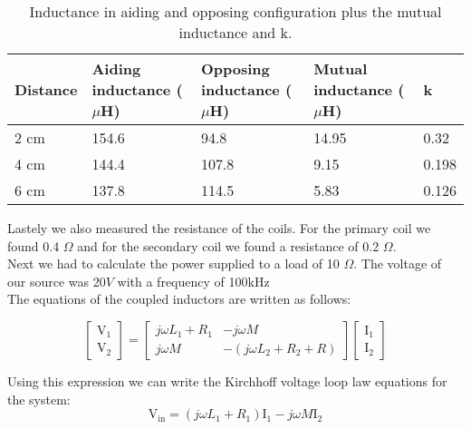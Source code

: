 \documentclass[final]{scrreprt} %
\begin{document}
\begin{table} [h]
\begin{center}
	\begin{tabular}{ l | l | l | l | l }
	Distance & Aiding inductance ($\mu$H) & Opposing inductance ($\mu$H) & Mutual inductance ($\mu$H) & k \\ \hline
  	2 cm & 154.6 & 94.8 & 14.95 & 0.32 \\
	4 cm & 144.4 & 107.8 & 9.15 & 0.198 \\
	6 cm & 137.8 & 114.5 & 5.83 & 0.126 \\
	\end{tabular}
	\caption{Inductance in aiding and opposing configuration plus the mutual inductance and k.}
	\label{tab:mutualinductance}
\end{center}
\end{table}

Lastely we also measured the resistance of the coils. For the primary coil we found 0.4 $\Omega$ and for the secondary coil we found a resistance of 0.2 $\Omega$. \\

Next we had to calculate the power supplied to a load of 10 $\Omega$. The voltage of our source was 20$V$ with a frequency of 100$\mathrm{kHz}$\\
The equations of the coupled inductors are written as follows: 

\[\left[ {\begin{array}{*{20}{c}}
{{{\boldsymbol{\mathrm{V_1}}}}}\\
{{\boldsymbol{\mathrm{V_2}}}}
\end{array}} \right] = \left[ {\begin{array}{*{20}{c}}
{j\omega {L_{1}} + {R_{1}}}&{ - j\omega M}\\
{j\omega M}&{ - \left( {j\omega {L_{2}} + {R_{2}} + R} \right)}
\end{array}} \right]\left[ {\begin{array}{*{20}{c}}
{{\boldsymbol{\mathrm{I_1}}}}\\
{{\boldsymbol{\mathrm{I_2}}}}
\end{array}} \right]\]

Using this expression we can write the Kirchhoff voltage loop law equations for the system:
\begin{equation} 
\label{eq3}
\boldsymbol{\mathrm{V_{in}}} = (j\omega {L_{1}} + {R_{1}} )\boldsymbol{\mathrm{I_{1}}} - j\omega M \boldsymbol{\mathrm{I_{2}}}
\end{equation}
\end{document}
